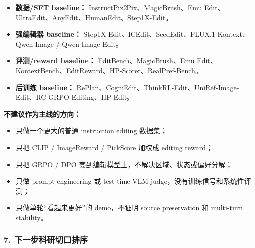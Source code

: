 \begin{itemize}[leftmargin=1.5em]
  \item \textbf{数据/SFT baseline：} InstructPix2Pix、MagicBrush、Emu Edit、UltraEdit、AnyEdit、HumanEdit、Step1X-Edit。
  \item \textbf{强编辑器 baseline：} Step1X-Edit、ICEdit、SeedEdit、FLUX.1 Kontext、Qwen-Image / Qwen-Image-Edit。
  \item \textbf{评测/reward baseline：} EditBench、MagicBrush、Emu Edit、KontextBench、EditReward、HP-Scorer、RealPref-Bench。
  \item \textbf{后训练 baseline：} RePlan、CogniEdit、ThinkRL-Edit、UniRef-Image-Edit、RC-GRPO-Editing、HP-Edit。
\end{itemize}

\textbf{不建议作为主线的方向：}

\begin{itemize}[leftmargin=1.5em]
  \item 只做一个更大的普通 instruction editing 数据集；
  \item 只把 CLIP / ImageReward / PickScore 加权成 editing reward；
  \item 只把 GRPO / DPO 套到编辑模型上，不解决区域、状态或偏好分解；
  \item 只做 prompt engineering 或 test-time VLM judge，没有训练信号和系统性评测；
  \item 只做单轮“看起来更好”的 demo，不证明 source preservation 和 multi-turn stability。
\end{itemize}

\subsubsection*{7. 下一步科研切口排序}

